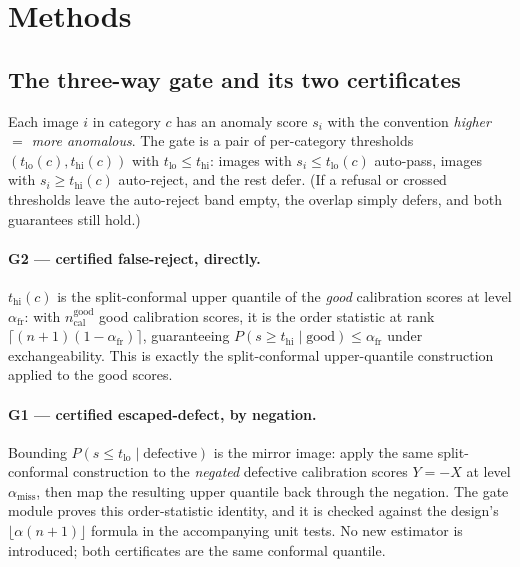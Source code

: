 \documentclass[11pt]{article}
\begin{document}
\section{Methods}
\label{sec:methods}

\subsection{The three-way gate and its two certificates}
\label{sec:gate}

Each image $i$ in category $c$ has an anomaly score $s_i$ with the convention \emph{higher
$=$ more anomalous}. The gate is a pair of per-category thresholds $(t_{\text{lo}}(c),
t_{\text{hi}}(c))$ with $t_{\text{lo}} \le t_{\text{hi}}$: images with $s_i \le t_{\text{lo}}(c)$
auto-pass, images with $s_i \ge t_{\text{hi}}(c)$ auto-reject, and the rest defer. (If a refusal or
crossed thresholds leave the auto-reject band empty, the overlap simply defers, and both guarantees
still hold.)

\paragraph{G2 --- certified false-reject, directly.} $t_{\text{hi}}(c)$ is the split-conformal
upper quantile of the \emph{good} calibration scores at level $\alpha_{\text{fr}}$: with
$n_{\text{cal}}^{\text{good}}$ good calibration scores, it is the order statistic at rank
$\lceil (n+1)(1-\alpha_{\text{fr}}) \rceil$, guaranteeing $P(s \ge t_{\text{hi}} \mid \text{good})
\le \alpha_{\text{fr}}$ under exchangeability. This is exactly the split-conformal upper-quantile
construction applied to the good scores.

\paragraph{G1 --- certified escaped-defect, by negation.} Bounding
$P(s \le t_{\text{lo}} \mid \text{defective})$ is the mirror image: apply the same split-conformal
construction to the \emph{negated} defective calibration scores $Y=-X$ at level
$\alpha_{\text{miss}}$, then map the resulting upper quantile back through the negation. The gate
module proves this order-statistic identity, and it is checked against the design's
$\lfloor \alpha(n+1)\rfloor$ formula in the accompanying unit tests. No new
estimator is introduced; both certificates are the same conformal quantile.
\end{document}
